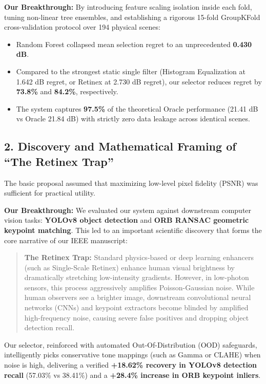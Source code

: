 \documentclass[10pt,a4paper]{article}
\begin{document}
\textbf{Our Breakthrough:}
By introducing feature scaling isolation inside each fold, tuning non-linear tree ensembles, and establishing a rigorous 15-fold GroupKFold cross-validation protocol over 194 physical scenes:
\begin{itemize}[noitemsep]
    \item Random Forest collapsed mean selection regret to an unprecedented \textbf{0.430 dB}.
    \item Compared to the strongest static single filter (Histogram Equalization at 1.642 dB regret, or Retinex at 2.730 dB regret), our selector reduces regret by \textbf{73.8\%} and \textbf{84.2\%}, respectively.
    \item The system captures \textbf{97.5\%} of the theoretical Oracle performance (21.41 dB vs Oracle 21.84 dB) with strictly zero data leakage across identical scenes.
\end{itemize}

\subsection{2. Discovery and Mathematical Framing of ``The Retinex Trap''}
The basic proposal assumed that maximizing low-level pixel fidelity (PSNR) was sufficient for practical utility.

\textbf{Our Breakthrough:}
We evaluated our system against downstream computer vision tasks: \textbf{YOLOv8 object detection} and \textbf{ORB RANSAC geometric keypoint matching}. This led to an important scientific discovery that forms the core narrative of our IEEE manuscript:
\begin{quote}
\textbf{The Retinex Trap:} Standard physics-based or deep learning enhancers (such as Single-Scale Retinex) enhance human visual brightness by dramatically stretching low-intensity gradients. However, in low-photon sensors, this process aggressively amplifies Poisson-Gaussian noise. While human observers see a brighter image, downstream convolutional neural networks (CNNs) and keypoint extractors become blinded by amplified high-frequency noise, causing severe false positives and dropping object detection recall.
\end{quote}
Our selector, reinforced with automated Out-Of-Distribution (OOD) safeguards, intelligently picks conservative tone mappings (such as Gamma or CLAHE) when noise is high, delivering a verified \textbf{+18.62\% recovery in YOLOv8 detection recall} (57.03\% vs 38.41\%) and a \textbf{+28.4\% increase in ORB keypoint inliers}.
\end{document}
